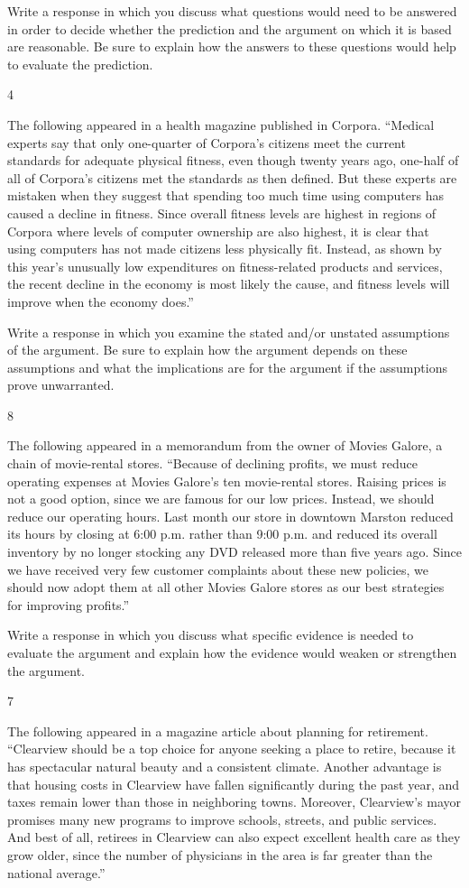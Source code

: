 \documentclass[]{article}
\begin{document}
Write a response in which you discuss what questions would need to be
answered in order to decide whether the prediction and the argument on
which it is based are reasonable. Be sure to explain how the answers to
these questions would help to evaluate the prediction.

4

The following appeared in a health magazine published in Corpora.
``Medical experts say that only one-quarter of Corpora's citizens meet
the current standards for adequate physical fitness, even though twenty
years ago, one-half of all of Corpora's citizens met the standards as
then defined. But these experts are mistaken when they suggest that
spending too much time using computers has caused a decline in fitness.
Since overall fitness levels are highest in regions of Corpora where
levels of computer ownership are also highest, it is clear that using
computers has not made citizens less physically fit. Instead, as shown
by this year's unusually low expenditures on fitness-related products
and services, the recent decline in the economy is most likely the
cause, and fitness levels will improve when the economy does.''

Write a response in which you examine the stated and/or unstated
assumptions of the argument. Be sure to explain how the argument depends
on these assumptions and what the implications are for the argument if
the assumptions prove unwarranted.

8

The following appeared in a memorandum from the owner of Movies Galore,
a chain of movie-rental stores. ``Because of declining profits, we must
reduce operating expenses at Movies Galore's ten movie-rental stores.
Raising prices is not a good option, since we are famous for our low
prices. Instead, we should reduce our operating hours. Last month our
store in downtown Marston reduced its hours by closing at 6:00 p.m.
rather than 9:00 p.m. and reduced its overall inventory by no longer
stocking any DVD released more than five years ago. Since we have
received very few customer complaints about these new policies, we
should now adopt them at all other Movies Galore stores as our best
strategies for improving profits.''

Write a response in which you discuss what specific evidence is needed
to evaluate the argument and explain how the evidence would weaken or
strengthen the argument.

7

The following appeared in a magazine article about planning for
retirement. ``Clearview should be a top choice for anyone seeking a
place to retire, because it has spectacular natural beauty and a
consistent climate. Another advantage is that housing costs in Clearview
have fallen significantly during the past year, and taxes remain lower
than those in neighboring towns. Moreover, Clearview's mayor promises
many new programs to improve schools, streets, and public services. And
best of all, retirees in Clearview can also expect excellent health care
as they grow older, since the number of physicians in the area is far
greater than the national average.''
\end{document}
